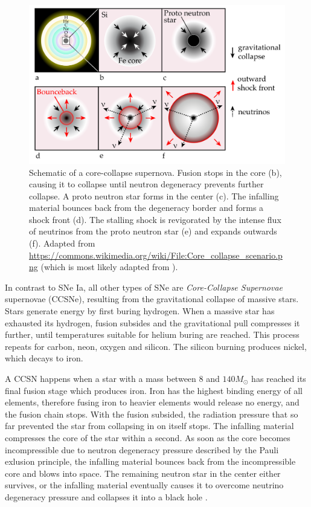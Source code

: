 \documentclass[
    a4paper, %
    fontsize=10pt, %
    twoside=false, %
    numbers=noenddot, %
    fontmethod=tex,
]{kaobook}
\begin{document}
\begin{figure}[htb]
    \includegraphics{theory/ccsn.pdf}
    \caption[Core-collapse supernova]{Schematic of a core-collapse supernova. Fusion stops in the core (b), causing it to collapse until neutron degeneracy prevents further collapse. A proto neutron star forms in the center (c). The infalling material bounces back from the degeneracy border and forms a shock front (d). The stalling shock is revigorated by the intense flux of neutrinos from the proto neutron star (e) and expands outwards (f). Adapted from \url{https://commons.wikimedia.org/wiki/File:Core_collapse_scenario.png} (which is most likely adapted from \cite{Janka2012}).}
\end{figure}

In contrast to SNe Ia, all other types of SNe are \textit{Core-Collapse Supernovae} supernovae (CCSNe), resulting from the gravitational collapse of massive stars. Stars generate energy by first buring hydrogen. When a massive star has exhausted its hydrogen, fusion subsides and the gravitational pull compresses it further, until temperatures suitable for helium buring are reached. This process repeats for carbon, neon, oxygen and silicon. The silicon burning produces nickel, which decays to iron.

A CCSN happens when a star with a mass between $8$ and $140 M_\odot$ has reached its final fusion stage which produces iron. Iron has the highest binding energy of all elements, therefore fusing iron to heavier elements would release no energy, and the fusion chain stops. With the fusion subsided, the radiation pressure that so far prevented the star from collapsing in on itself stops. The infalling material compresses the core of the star within a second. As soon as the core becomes incompressible due to neutron degeneracy pressure described by the Pauli exlusion principle, the infalling material bounces back from the incompressible core and blows into space. The remaining neutron star in the center either survives, or the infalling material eventually causes it to overcome neutrino degeneracy pressure and collapses it into a black hole \cite{Alsabti2017}.
\end{document}
